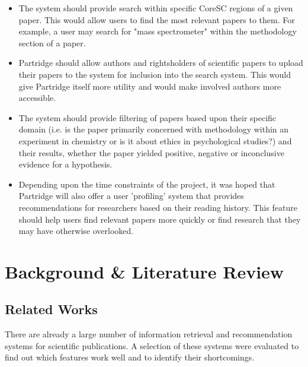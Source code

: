 \begin{itemize}
\item The system should provide search within specific CoreSC regions of a given
paper. This would allow users to find the most relevant papers to them. For
example, a user may search for "mass spectrometer" within the methodology
section of a paper.
\item Partridge should allow authors and rightsholders of scientific papers to
upload their papers to the system for inclusion into the search system. This
would give Partridge itself more utility and would make involved authors more
accessible.
\item The system should provide filtering of papers based upon their
specific domain (i.e. is the paper primarily concerned with methodology within
an experiment in chemistry or is it about ethics in psychological studies?) and
their results, whether the paper yielded positive, negative or inconclusive
evidence for a hypothesis. 
\item Depending upon the time constraints of the
project, it was hoped that Partridge will also offer a user 'profiling' system
that provides recommendations for researchers based on their reading history.
This feature should help users find relevant papers more quickly or find
research that they may have otherwise overlooked.
\end{itemize}

\section{Background \& Literature Review}

\subsection{ Related Works }

There are already a large number of information retrieval and recommendation
systems for scientific publications. A selection of these systems were
evaluated to find out which features work well and to identify their
shortcomings.


